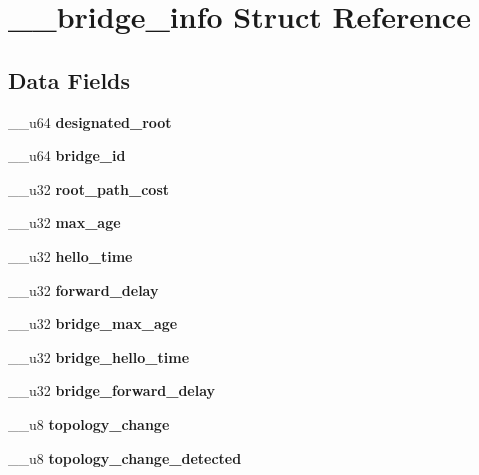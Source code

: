\section{\-\_\-\-\_\-bridge\-\_\-info \-Struct \-Reference}
\label{struct____bridge__info}
\subsection*{\-Data \-Fields}
\begin{DoxyCompactItemize}
\item 
\-\_\-\-\_\-u64 {\bfseries designated\-\_\-root}\label{struct____bridge__info_a1d5e0519b1529436dcb61c6a85fa1f03}

\item 
\-\_\-\-\_\-u64 {\bfseries bridge\-\_\-id}\label{struct____bridge__info_a1cedc5f0f21087bf0eb8d8ba9e95a383}

\item 
\-\_\-\-\_\-u32 {\bfseries root\-\_\-path\-\_\-cost}\label{struct____bridge__info_af7c05b7df242116a64cf7d68df104be7}

\item 
\-\_\-\-\_\-u32 {\bfseries max\-\_\-age}\label{struct____bridge__info_a445d49d0173c9db133925d7f9475ecda}

\item 
\-\_\-\-\_\-u32 {\bfseries hello\-\_\-time}\label{struct____bridge__info_ab6f456ece523fee8ef83b011a8911024}

\item 
\-\_\-\-\_\-u32 {\bfseries forward\-\_\-delay}\label{struct____bridge__info_a7c5f3696c1850113978069b0654e097c}

\item 
\-\_\-\-\_\-u32 {\bfseries bridge\-\_\-max\-\_\-age}\label{struct____bridge__info_a0cac63c22cd8281485387b2b77599746}

\item 
\-\_\-\-\_\-u32 {\bfseries bridge\-\_\-hello\-\_\-time}\label{struct____bridge__info_afc3113b8e663e8471a5021dc724a1e78}

\item 
\-\_\-\-\_\-u32 {\bfseries bridge\-\_\-forward\-\_\-delay}\label{struct____bridge__info_a4a2a97c99749d9a10d1715d096551a83}

\item 
\-\_\-\-\_\-u8 {\bfseries topology\-\_\-change}\label{struct____bridge__info_a2fb51f84d37794654c70e8e6bc1183d3}

\item 
\-\_\-\-\_\-u8 {\bfseries topology\-\_\-change\-\_\-detected}\label{struct____bridge__info_a4cee4dfa187238e7077a11cc9da25121}


\end{DoxyCompactItemize}
